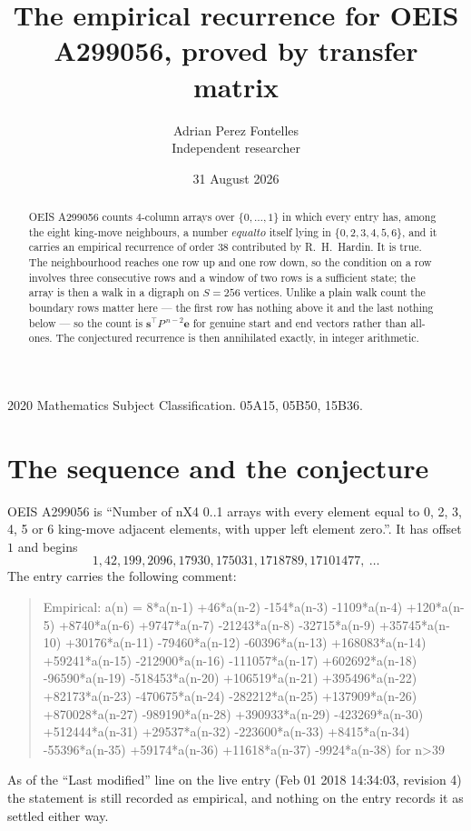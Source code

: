 \documentclass[11pt,a4paper]{article}
\title{The empirical recurrence for OEIS A299056, proved by transfer matrix}
\author{Adrian Perez Fontelles\\ \small Independent researcher}
\date{31 August 2026}
\theoremstyle{plain}
\theoremstyle{definition}
\begin{document}
\maketitle

\begin{abstract}
OEIS A299056 counts $4$-column arrays over $\{0,\dots,1\}$ in which every entry has,
among the eight king-move neighbours, a number $equal to$ itself lying in $\{0,2,3,4,5,6\}$, and it carries an empirical
recurrence of order $38$ contributed by R.~H.~Hardin. It is true. The neighbourhood
reaches one row up and one row down, so the condition on a row involves three consecutive
rows and a window of two rows is a sufficient state; the array is then a walk in a digraph
on $S=256$ vertices. Unlike a plain walk count the boundary rows matter here --- the first
row has nothing above it and the last nothing below --- so the count is
$\mathbf{s}^{\!\top}P^{\,n-2}\mathbf{e}$ for genuine start and end vectors rather than
all-ones. The conjectured recurrence is then annihilated exactly, in integer arithmetic.
\end{abstract}

\noindent\small 2020 Mathematics Subject Classification. 05A15, 05B50, 15B36.\normalsize

\section{The sequence and the conjecture}

OEIS A299056 is ``Number of nX4 0..1 arrays with every element equal to 0, 2, 3, 4, 5 or 6 king-move adjacent elements, with upper left element zero.''. It has offset
$1$ and begins
\[
1, 42, 199, 2096, 17930, 175031, 1718789, 17101477,\ \dots
\]
The entry carries the following comment:
\begin{quote}\small
Empirical: a(n) = 8*a(n-1) +46*a(n-2) -154*a(n-3) -1109*a(n-4) +120*a(n-5) +8740*a(n-6) +9747*a(n-7) -21243*a(n-8) -32715*a(n-9) +35745*a(n-10) +30176*a(n-11) -79460*a(n-12) -60396*a(n-13) +168083*a(n-14) +59241*a(n-15) -212900*a(n-16) -111057*a(n-17) +602692*a(n-18) -96590*a(n-19) -518453*a(n-20) +106519*a(n-21) +395496*a(n-22) +82173*a(n-23) -470675*a(n-24) -282212*a(n-25) +137909*a(n-26) +870028*a(n-27) -989190*a(n-28) +390933*a(n-29) -423269*a(n-30) +512444*a(n-31) +29537*a(n-32) -223600*a(n-33) +8415*a(n-34) -55396*a(n-35) +59174*a(n-36) +11618*a(n-37) -9924*a(n-38) for n>39
\end{quote}
As of the ``Last modified'' line on the live entry (Feb 01 2018 14:34:03, revision
4) the statement is still recorded as empirical, and nothing on the entry
records it as settled either way.
\end{document}

